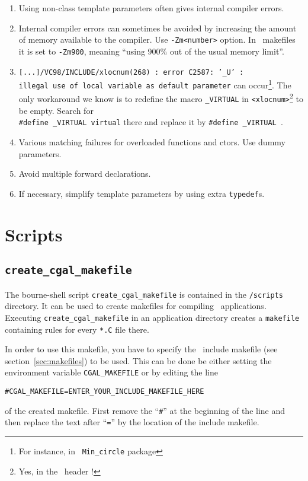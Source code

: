 \begin{enumerate}
\label{msvc::friend}
%
\item Using non-class template parameters often gives internal
  compiler errors.
%
\item Internal compiler errors can sometimes be avoided by increasing
  the amount of memory available to the compiler. Use \texttt{-Zm<number>}
option. In \cgal\ makefiles it is set to \texttt{-Zm900}, meaning
``using 900\% out of the usual memory limit''. \label{msvc::Zm}
%
\item \texttt{[...]/VC98/INCLUDE/xlocnum(268) : 
error C2587: '\_U' :\\ 
illegal use of local variable as default
parameter} can occur\footnote{For instance, in \cgal\
\texttt{Min\_circle} package}. The only workaround we know is to redefine
the macro \texttt{\_VIRTUAL} in 
\texttt{<xlocnum>}\footnote{Yes, in the \msvc\ header !}
to be empty. Search for\\
 \texttt{\#define~\_VIRTUAL~virtual} there and
replace it by \texttt{\#define~\_VIRTUAL~}. \label{msvc::VIRTUAL}
%
\item Various matching failures for overloaded functions and ctors.
Use dummy parameters.
%
\item Avoid multiple forward declarations.
%
\item If necessary, simplify template parameters by using extra 
\texttt{typedef}s.
\end{enumerate}

\section{Scripts}

\subsection{\texttt{create\_cgal\_makefile}}\label{sec:create_cgal_makefile}

The bourne-shell script \texttt{create\_cgal\_makefile} is contained
in the \cgaldir\texttt{/scripts} directory. It can be used to create
makefiles for compiling \cgal\ applications. Executing
\texttt{create\_cgal\_makefile} in an application directory creates a
\texttt{makefile} containing rules for every \texttt{*.C} file there.

In order to use this makefile, you have to specify the \cgal\ include
makefile (see section~\ref{sec:makefiles}) to be used. This can be
done be either setting the environment variable
\texttt{CGAL\_MAKEFILE} or by editing the line
\begin{alltt}
  # CGAL_MAKEFILE = ENTER_YOUR_INCLUDE_MAKEFILE_HERE
\end{alltt}
of the created makefile. First remove the ``\texttt{\#}'' at the
beginning of the line and then replace the text after ``\texttt{=}''
by the location of the include makefile. 

